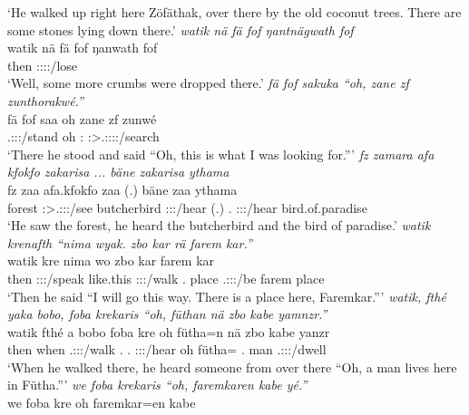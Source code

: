 \begin{exe}
	\trans `He walked up right here Zöfäthak, over there by the old coconut trees. There are some stones lying down there.'
	\emph{watik nä fä fof ŋantnägwath fof}\\
	\gll watik nä fä fof ŋanwath fof\\ 
	then {\Indf} {\Dist} {\Emph} \Stpl:\Sbj:\Pst:\Ipfv:\Venit/lose {\Emph}\\
	\trans `Well, some more crumbs were dropped there.'
	\emph{fä fof sakuka ``oh, zane zf zunthorakwé.''}\\
	\gll fä fof saa oh zane zf zunwé\\ 
	{\Dist} {\Emph} \Tsg.\Masc:\Sbj:\Pst:\Pfv/stand oh \Dem:{\Prox} {\Imm} \Fsg:\Sbj>\Tsg.\F:\Obj:\Rpst:\Ipfv:\Venit/search\\
	\trans `There he stood and said ``Oh, this is what I was looking for.'''
	\emph{fz zamara afa kfokfo zakarisa ... bäne zakarisa ythama}\\
	\gll fz zaa {afa.kfokfo} zaa (.) bäne zaa ythama\\ 
	forest \Sg:\Sbj>\Tsg.\F:\Obj:\Pst:\Pfv/see butcherbird \Sg:\Sbj:\Pst:\Pfv/hear (.) \Recog.{\Abs} \Sg:\Sbj:\Pst:\Pfv/hear bird.of.paradise\\
	\trans `He saw the forest, he heard the butcherbird and the bird of paradise.'
	\emph{watik krenafth ``nima wyak. zbo kar rä farem kar.''}\\
	\gll watik kre nima wo zbo kar  farem kar\\ 
	then \Stsg:\Sbj:\Irr:\Pfv/speak like.this \Fsg:\Sbj:\Nonpast:\Ipfv/walk \Prox.{\All} place \Tsg.\F:\Sbj:\Nonpast:\Ipfv/be farem place\\
	\trans `Then he said ``I will go this way. There is a place here, Faremkar.'''
	\emph{watik, fthé yaka bobo, foba krekaris ``oh, füthan nä zbo kabe yamnzr.''}\\
	\gll watik fthé a bobo foba kre oh fütha=n nä zbo kabe yanzr\\ 
	then when \Tsg.\Masc:\Sbj:\Pst:\Ipfv/walk \Med.{\All} \Dist.{\Abl} \Stsg:\Sbj:\Irr:\Pfv/hear oh fütha={\Loc} {\Indf} \Prox.{\All} man \Tsg.\Masc:\Sbj:\Nonpast:\Ipfv/dwell\\
	\trans `When he walked there, he heard someone from over there ``Oh, a man lives here in Fütha.'''
	\emph{we foba krekaris ``oh, faremkaren kabe yé.''}\\
	\gll we foba kre oh faremkar=en kabe \\ 

\end{exe}
